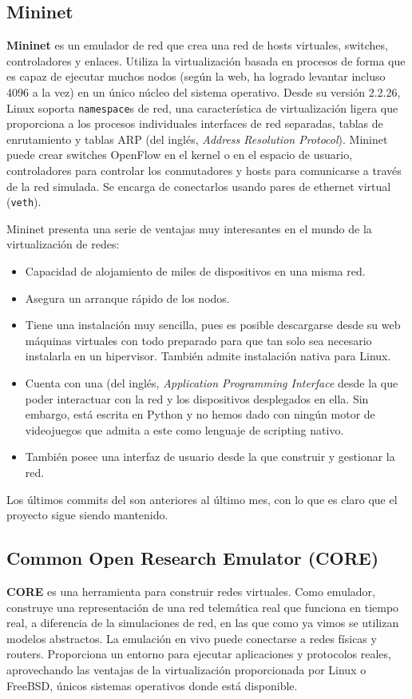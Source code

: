 \subsection{Mininet}
\textbf{Mininet} es un emulador de red que crea una red de hosts virtuales, switches, controladores y enlaces. Utiliza la virtualización basada en procesos de forma que es capaz de ejecutar muchos nodos (según la web, ha logrado levantar incluso 4096 a la vez) en un único núcleo del sistema operativo. Desde su versión 2.2.26, Linux soporta \texttt{namespace}s de red, una característica de virtualización ligera que proporciona a los procesos individuales interfaces de red separadas, tablas de enrutamiento y tablas ARP (del inglés, \textit{Address Resolution Protocol}). Mininet puede crear switches OpenFlow en el kernel o en el espacio de usuario, controladores para controlar los conmutadores y hosts para comunicarse a través de la red simulada. Se encarga de conectarlos usando pares de ethernet virtual (\texttt{veth})\cite{mininet}.

Mininet presenta una serie de ventajas muy interesantes en el mundo de la virtualización de redes:
\begin{itemize}
\item Capacidad de alojamiento de miles de dispositivos en una misma red. 
\item Asegura un arranque rápido de los nodos.
\item Tiene una instalación muy sencilla, pues es posible descargarse desde su web máquinas virtuales con todo preparado para que tan solo sea necesario instalarla en un hipervisor. También admite instalación nativa para Linux.
\item Cuenta con una  (del inglés, \textit{Application Programming Interface} desde la que poder interactuar con la red y los dispositivos desplegados en ella. Sin embargo, está escrita en Python y no hemos dado con ningún motor de videojuegos que admita a este como lenguaje de scripting nativo.
\item También posee una interfaz de usuario desde la que construir y gestionar la red.
\end{itemize}

Los últimos commits del  son anteriores al último mes, con lo que es claro que el proyecto sigue siendo mantenido.

\subsection{Common Open Research Emulator (CORE)}
\textbf{CORE} es una herramienta para construir redes virtuales. Como emulador, construye una representación de una red telemática real que funciona en tiempo real, a diferencia de la simulaciones de red, en las que como ya vimos se utilizan modelos abstractos.  La emulación en vivo puede conectarse a redes físicas y routers. Proporciona un entorno para ejecutar aplicaciones y protocolos reales, aprovechando las ventajas de la virtualización proporcionada por Linux o FreeBSD, únicos sistemas operativos donde está disponible. 

